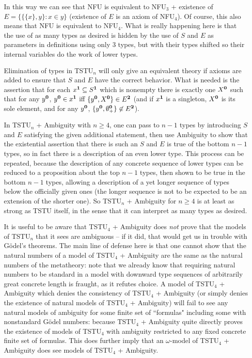 \documentclass[12pt]{article}
\begin{document}
In this way we can see that NFU is equivalent to NFU$_3$ + existence of $E = \{\{\{x\},y\}:x \in y\}$ (existence of $E$ is an axiom of NFU$_4$).  Of course, this also means that NFU is equivalent to NFU$_4$.  What is really happening here is that the use of as many types as desired is hidden by the use of $S$ and $E$ as parameters in definitions using only 3 types, but with their types shifted so their internal variables do the work of lower types.

Elimination of types in TSTU$_n$ will only give an equivalent theory if axioms are added to ensure that $S$ and $E$ have the correct behavior.  What is needed is the assertion that for each $x^{\bf 1} \subseteq S^{\bf 1}$ which is
nonempty there is exactly one $X^{\bf 0}$ such that for any $y^{\bf 0}$, $y^{\bf 0} \in x^{\bf 1}$ iff $\{y^{\bf 0},X^{\bf 0}\} \in E^{\bf 2}$ (and if $x^{\bf 1}$ is a singleton, $X^{\bf 0}$ is its sole element, and for any $y^{\bf 0}$, $\{y^{\bf 0},\emptyset^{\bf 0}_+\} \not\in E^{\bf 2}$). 

In TSTU$_n$ + Ambiguity with $n \geq 4$, one can pass to $n-1$ types by introducing $S$ and $E$ satisfying the given additional statement, then use Ambiguity to show that the existential assertion that there is such an $S$ and $E$  is true of the bottom $n-1$ types,
so in fact there is a description of an even lower type.  This process can be repeated, because the description of any concrete sequence of lower types can be reduced to a proposition about the top $n-1$ types, then shown to
be true in the bottom $n-1$ types, allowing a description of a yet longer sequence of types below the officially given ones (the longer sequence is not to be expected to be an extension of the shorter one).  So TSTU$_n$  + Ambiguity for $n \geq 4$ is at least as strong as TSTU itself, in the sense that it can interpret as many types as desired.

It is useful to be aware that  TSTU$_4$ + Ambiguity does {\em not\/} prove that the models of TSTU$_n$ that it sees are ambiguous -- if it did, that would get us in trouble with G\"odel's theorems.  The main line of defense here is that one cannot show that the natural numbers of a model of TSTU$_4$ + Ambiguity are the same as the natural numbers of the metatheory:  note that
we already know that requiring natural numbers to be standard in a model with downward type sequences of arbitrarily great concrete length is fraught, as it refutes choice.  A model of  TSTU$_4$ + Ambiguity which denies the consistency of TSTU$_4$ + Ambiguity (or simply denies the existence of natural models of TSTU$_4$ + Ambiguity) will fail to see any natural models of ambiguity for some finite set of ``formulas" including some with nonstandard G\"odel numbers:  because  TSTU$_4$ + Ambiguity quite directly proves the existence of models of TSTU$_4$ with ambiguity restricted to any fixed concrete finite set of formulas.  This does further imply that an $\omega$-model of
TSTU$_4$ + Ambiguity does see  models of TSTU$_4$ + Ambiguity.
\end{document}

